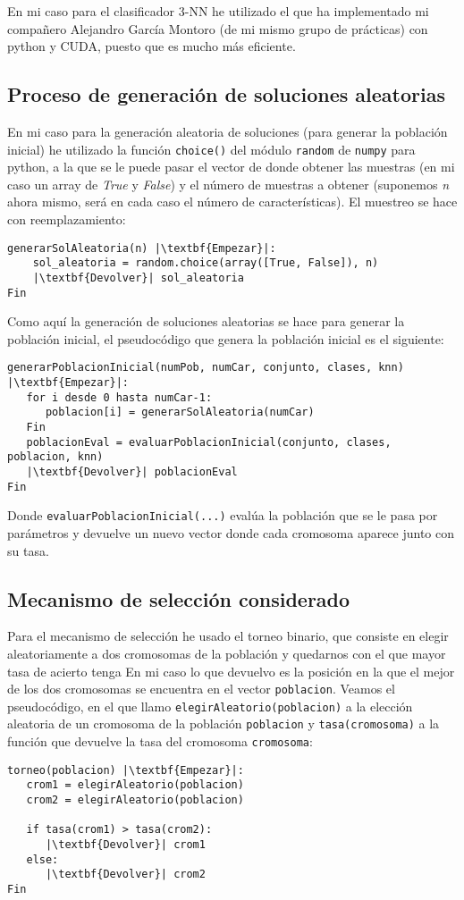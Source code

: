 \documentclass[12pt]{article}
\begin{document}
En mi caso para el clasificador 3-NN he utilizado el que ha implementado mi compañero Alejandro García Montoro (de mi mismo grupo de prácticas) con python y CUDA, puesto que es mucho más eficiente.

\subsection{Proceso de generación de soluciones aleatorias}
En mi caso para la generación aleatoria de soluciones (para generar la población inicial) he utilizado la función \texttt{choice()} del módulo \texttt{random} de \texttt{numpy} para python, a la que se le puede pasar el vector de donde obtener las muestras (en mi caso un array de \textit{True} y \textit{False}) y el número de muestras a obtener (suponemos \textit{n} ahora mismo, será en cada caso el número de características). El muestreo se hace con reemplazamiento:
\begin{lstlisting}
generarSolAleatoria(n) |\textbf{Empezar}|:
	sol_aleatoria = random.choice(array([True, False]), n)
	|\textbf{Devolver}| sol_aleatoria
Fin
\end{lstlisting}

Como aquí la generación de soluciones aleatorias se hace para generar la población inicial, el pseudocódigo que genera la población inicial es el siguiente:
\begin{lstlisting}
generarPoblacionInicial(numPob, numCar, conjunto, clases, knn) |\textbf{Empezar}|:
   for i desde 0 hasta numCar-1:
      poblacion[i] = generarSolAleatoria(numCar)
   Fin
   poblacionEval = evaluarPoblacionInicial(conjunto, clases, poblacion, knn)
   |\textbf{Devolver}| poblacionEval
Fin
\end{lstlisting}

Donde \texttt{evaluarPoblacionInicial(...)} evalúa la población que se le pasa por parámetros y devuelve un nuevo vector donde cada cromosoma aparece junto con su tasa.

\subsection{Mecanismo de selección considerado}
Para el mecanismo de selección he usado el torneo binario, que consiste en elegir aleatoriamente a dos cromosomas de la población y quedarnos con el que mayor tasa de acierto tenga En mi caso lo que devuelvo es la posición en la que el mejor de los dos cromosomas se encuentra en el vector \texttt{poblacion}. Veamos el pseudocódigo, en el que llamo \texttt{elegirAleatorio(poblacion)} a la elección aleatoria de un cromosoma de la población \texttt{poblacion} y \texttt{tasa(cromosoma)} a la función que devuelve la tasa del cromosoma \texttt{cromosoma}:
\begin{lstlisting}
torneo(poblacion) |\textbf{Empezar}|:
   crom1 = elegirAleatorio(poblacion)
   crom2 = elegirAleatorio(poblacion)
   
   if tasa(crom1) > tasa(crom2):
      |\textbf{Devolver}| crom1
   else:
      |\textbf{Devolver}| crom2
Fin
\end{lstlisting}
\end{document}
